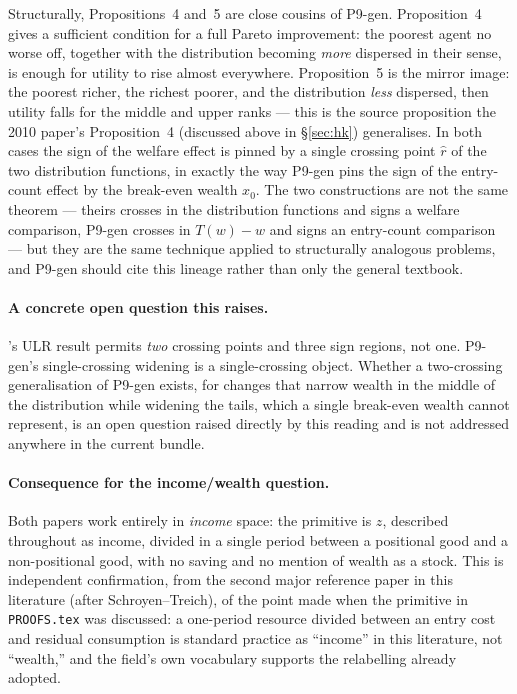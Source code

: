 \documentclass[11pt,a4paper]{article}
\begin{document}
Structurally, \citet{HopkinsKornienko2009} Propositions~4 and~5 are close
cousins of P9-gen. Proposition~4 gives a sufficient condition for a full Pareto
improvement: the poorest agent no worse off, together with the distribution
becoming \emph{more} dispersed in their sense, is enough for utility to rise
almost everywhere. Proposition~5 is the mirror image: the poorest richer, the
richest poorer, and the distribution \emph{less} dispersed, then utility falls
for the middle and upper ranks --- this is the source proposition the 2010
paper's Proposition~4 (discussed above in \S\ref{sec:hk}) generalises. In both
cases the sign of the welfare effect is pinned by a single crossing point
$\hat r$ of the two distribution functions, in exactly the way P9-gen pins the
sign of the entry-count effect by the break-even wealth $x_0$. The two constructions are not
the same theorem --- theirs crosses in the distribution functions and signs a
welfare comparison, P9-gen crosses in $T(w) - w$ and signs an entry-count
comparison --- but they are the same technique applied to structurally
analogous problems, and P9-gen should cite this lineage rather than only the
general textbook.

\paragraph{A concrete open question this raises.} \citet{HopkinsKornienko2004}'s
ULR result permits \emph{two} crossing points and three sign regions, not one.
P9-gen's single-crossing widening is a single-crossing object. Whether a
two-crossing generalisation of P9-gen exists, for changes that narrow wealth in
the middle of the distribution while widening the tails, which a single
break-even wealth cannot represent, is an open question raised directly by this
reading and is not addressed anywhere in the current bundle.

\paragraph{Consequence for the income/wealth question.} Both papers work
entirely in \emph{income} space: the primitive is $z$, described throughout as
income, divided in a single period between a positional good and a
non-positional good, with no saving and no mention of wealth as a stock. This
is independent confirmation, from the second major reference paper in this
literature (after Schroyen--Treich), of the point made when the primitive in
\texttt{PROOFS.tex} was discussed: a one-period resource divided between an
entry cost and residual consumption is standard practice as ``income'' in this
literature, not ``wealth,'' and the field's own vocabulary supports the
relabelling already adopted.
\end{document}
